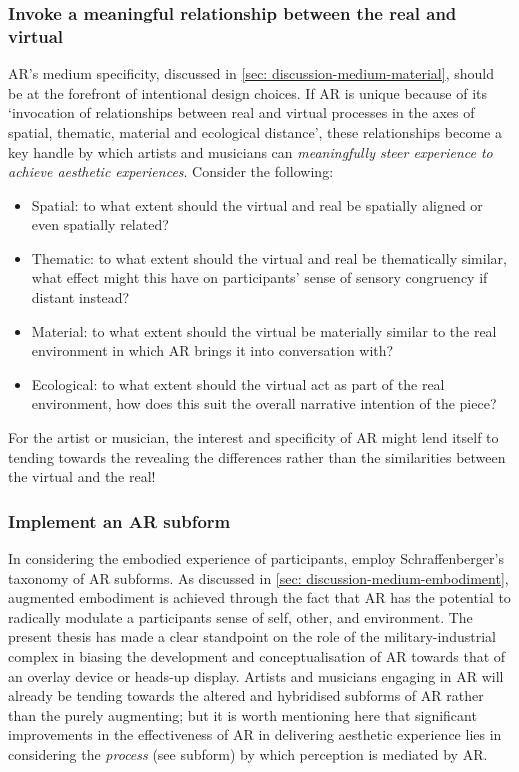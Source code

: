 \subsubsection{Invoke a meaningful relationship between the real and virtual}
AR's medium specificity, discussed in \autoref{sec: discussion-medium-material}, should be at the forefront of intentional design choices. If AR is unique because of its `invocation of relationships between real and virtual processes in the axes of spatial, thematic, material and ecological distance', these relationships become a key handle by which artists and musicians can \textit{meaningfully steer experience to achieve aesthetic experiences}. Consider the following:
\begin{itemize}
    \item Spatial: to what extent should the virtual and real be spatially aligned or even spatially related?
    \item Thematic: to what extent should the virtual and real be thematically similar, what effect might this have on participants' sense of sensory congruency if distant instead?
    \item Material: to what extent should the virtual be materially similar to the real environment in which AR brings it into conversation with? 
    \item Ecological: to what extent should the virtual act as part of the real environment, how does this suit the overall narrative intention of the piece?
\end{itemize}
For the artist or musician, the interest and specificity of AR might lend itself to tending towards the revealing the differences rather than the similarities between the virtual and the real!

\subsubsection{Implement an AR subform}
In considering the embodied experience of participants, employ Schraffenberger's taxonomy of AR subforms. As discussed in \autoref{sec: discussion-medium-embodiment}, augmented embodiment is achieved through the fact that AR has the potential to radically modulate a participants sense of self, other, and environment. The present thesis has made a clear standpoint on the role of the military-industrial complex in biasing the development and conceptualisation of AR towards that of an overlay device or heads-up display. Artists and musicians engaging in AR will already be tending towards the altered and hybridised subforms of AR rather than the purely augmenting; but it is worth mentioning here that significant improvements in the effectiveness of AR in delivering aesthetic experience lies in considering the \textit{process} (see subform) by which perception is mediated by AR.

